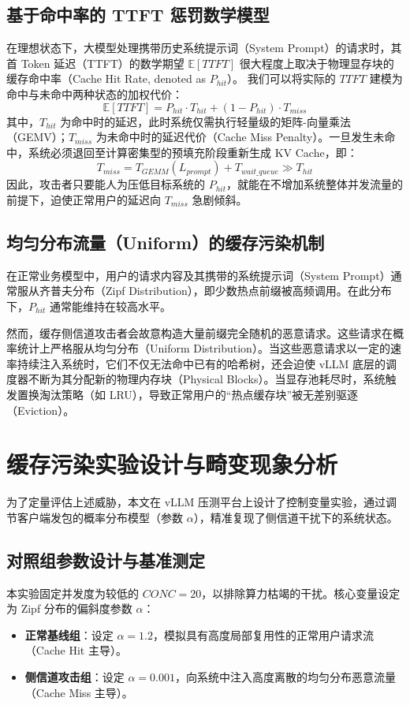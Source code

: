 \documentclass[master, vlined]{DissertUESTC}
\begin{document}
	\subsection{基于命中率的 TTFT 惩罚数学模型}
	在理想状态下，大模型处理携带历史系统提示词（System Prompt）的请求时，其首 Token 延迟（TTFT）的数学期望 $\mathbb{E}[TTFT]$ 很大程度上取决于物理显存块的缓存命中率（Cache Hit Rate, denoted as $P_{hit}$）。
	我们可以将实际的 $TTFT$ 建模为命中与未命中两种状态的加权代价：
	\begin{equation}
		\mathbb{E}[TTFT] = P_{hit} \cdot T_{hit} + (1 - P_{hit}) \cdot T_{miss}
	\end{equation}
	其中，$T_{hit}$ 为命中时的延迟，此时系统仅需执行轻量级的矩阵-向量乘法（GEMV）；$T_{miss}$ 为未命中时的延迟代价（Cache Miss Penalty）。一旦发生未命中，系统必须退回至计算密集型的预填充阶段重新生成 KV Cache，即：
	\begin{equation}
		T_{miss} = T_{GEMM}(L_{prompt}) + T_{wait\_queue} \gg T_{hit}
	\end{equation}
	因此，攻击者只要能人为压低目标系统的 $P_{hit}$，就能在不增加系统整体并发流量的前提下，迫使正常用户的延迟向 $T_{miss}$ 急剧倾斜。

	\subsection{均匀分布流量（Uniform）的缓存污染机制}
	在正常业务模型中，用户的请求内容及其携带的系统提示词（System Prompt）通常服从齐普夫分布（Zipf Distribution）\cite{齐普夫定律与互联网分布}，即少数热点前缀被高频调用。在此分布下，$P_{hit}$ 通常能维持在较高水平。

	然而，缓存侧信道攻击者会故意构造大量前缀完全随机的恶意请求。这些请求在概率统计上严格服从均匀分布（Uniform Distribution）。当这些恶意请求以一定的速率持续注入系统时，它们不仅无法命中已有的哈希树，还会迫使 vLLM 底层的调度器不断为其分配新的物理内存块（Physical Blocks）。当显存池耗尽时，系统触发置换淘汰策略（如 LRU），导致正常用户的“热点缓存块”被无差别驱逐（Eviction）。

	\section{缓存污染实验设计与畸变现象分析}

	为了定量评估上述威胁，本文在 vLLM 压测平台上设计了控制变量实验，通过调节客户端发包的概率分布模型（参数 $\alpha$），精准复现了侧信道干扰下的系统状态。

	\subsection{对照组参数设计与基准测定}
	本实验固定并发度为较低的 $CONC=20$，以排除算力枯竭的干扰。核心变量设定为 Zipf 分布的偏斜度参数 $\alpha$：
	\begin{itemize}
		\item \textbf{正常基线组}：设定 $\alpha=1.2$，模拟具有高度局部复用性的正常用户请求流（Cache Hit 主导）。
		\item \textbf{侧信道攻击组}：设定 $\alpha=0.001$，向系统中注入高度离散的均匀分布恶意流量（Cache Miss 主导）。
	\end{itemize}
\end{document}

